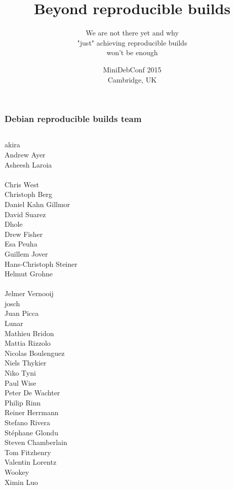 \documentclass[14pt]{beamer}
\title[Reproducible builds]{Beyond reproducible builds}
\subtitle{We are not there yet and why \\ "just" achieving reproducible builds
\\ won't be enough}
\author[lamby \& h01ger]{%
   \texorpdfstring{
        \begin{columns}
            \column{.45\linewidth}
            \centering
            Chris Lamb (lamby) \\
            \href{mailto:lamby@debian.org}{lamby@debian.org}
            \column{.45\linewidth}
            \centering
            Holger 'h01ger' Levsen\\
            \href{mailto:holger@debian.org}{holger@debian.org}
        \end{columns}
   }{lamby \& h01ger}}
\institute[Debian]{}
\date[MiniDebConf Cambridge '15]{%
 MiniDebConf 2015\\
 Cambridge, UK}
\begin{document}
\begin{frame}
 \titlepage
\end{frame}

\begin{frame}
 \frametitle{Debian reproducible builds team}
 \begin{center}
  \begin{columns}
   \small
    {akira} \\
    {Andrew Ayer} \\
    {Asheesh Laroia} \\
     \\
    {Chris West} \\
    {Christoph Berg} \\
    {Daniel Kahn Gillmor} \\
    David Suarez \\
    {Dhole} \\
    Drew Fisher \\
    Esa Peuha \\
    {Guillem Jover} \\
    Hans-Christoph Steiner \\
    {Helmut Grohne} \\
     \\
    Jelmer Vernooij \\
    {josch} \\
    Juan Picca \\
    {Lunar} \\
    Mathieu Bridon \\
    {Mattia Rizzolo} \\
    Nicolas Boulenguez \\
    {Niels Thykier} \\
    Niko Tyni \\
    {Paul Wise} \\
    Peter De Wachter \\
    Philip Rinn \\
    {Reiner Herrmann} \\
    {Stefano Rivera} \\
    {Stéphane Glondu} \\
    {Steven Chamberlain} \\
    Tom Fitzhenry \\
    Valentin Lorentz \\
    {Wookey} \\
    {Ximin Luo} \\
  \end{columns}
 \end{center}
\end{frame}
\end{document}
